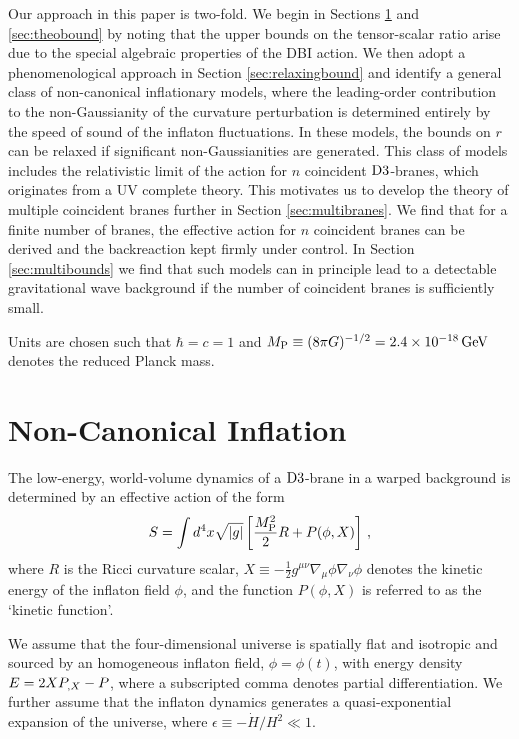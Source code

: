Our approach in this paper is two-fold. We 
begin in Sections \ref{sec:noncanoninfl} and \ref{sec:theobound} 
by noting that the upper bounds on the tensor-scalar ratio arise due to the
special algebraic properties of the DBI action. We 
then adopt a phenomenological approach in Section \ref{sec:relaxingbound}
and identify a general class of non-canonical inflationary models, 
where the leading-order contribution to the non-Gaussianity of the 
curvature perturbation is determined 
entirely by the speed of sound of the inflaton fluctuations. 
In these models, the bounds on $r$ can be relaxed 
if significant non-Gaussianities are generated.  
This class of models includes the relativistic limit  
of the action for $n$ coincident ${\rm D3}$-branes, 
which originates from a UV complete theory. This motivates us 
to develop the theory of multiple coincident branes further in Section
\ref{sec:multibranes}. We find that for a finite number of branes, 
the effective action for $n$ coincident branes can be derived and the backreaction
kept firmly under control.
In Section \ref{sec:multibounds} we find that such models 
can in principle lead to a detectable 
gravitational wave background if 
the number of coincident branes is sufficiently small. 

Units are chosen such that $\hbar = c =1$ and $M_{\rm P} \equiv (8\pi G)^{-1/2}
= 2.4 \times 10^{-18} \, {\rm GeV}$ denotes the 
reduced Planck mass. 

\section{Non-Canonical Inflation} \label{sec:noncanoninfl}

The low-energy, world-volume dynamics of a 
${\rm D3}$-brane in a warped background is determined 
by an effective action of the form 
\begin{equation}
\label{DBIaction}
S=\int  d^4x \sqrt{|g|} \left[ \frac{M_{\rm P}^2}{2} R 
+ P (\phi , X) \right] \,,
\end{equation}
where $R$ is the Ricci curvature scalar, 
$X \equiv -\frac{1}{2}g^{\mu \nu}\nabla_\mu \phi \nabla_\nu \phi$
denotes the kinetic energy of the inflaton field $\phi$, and the function  
$P (\phi , X)$ is referred to as the `kinetic function'.  

We assume that the four-dimensional universe is   
spatially flat and isotropic and sourced by an  
homogeneous inflaton field, $\phi =\phi (t)$, with energy 
density $E = 2XP_{,X} - P$, where a subscripted comma denotes partial
differentiation. 
We further assume that the inflaton dynamics  
generates a quasi-exponential expansion of the universe, 
where $\epsilon \equiv -\dot{H}/H^2 \ll1$. 
 
